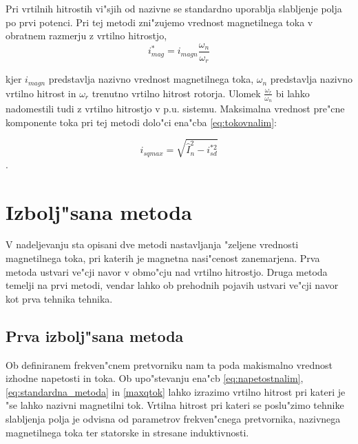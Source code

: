 \documentclass[journal,a4paper,twoside]{sty/IEEEtran}
\begin{document}
Pri vrtilnih hitrostih vi"sjih od nazivne se standardno uporablja slabljenje polja po prvi potenci. Pri tej metodi zni"zujemo vrednost magnetilnega toka v obratnem razmerju z vrtilno hitrostjo,
\begin{equation}
\label{eq:standardna_metoda}
i_{mag}^*=i_{magn}\frac{\omega_n}{\omega_r}
\end{equation}

kjer $i_{magn}$ predstavlja nazivno vrednost magnetilnega toka, $\omega_{n}$ predstavlja nazivno vrtilno hitrost in $\omega_{r}$ trenutno vrtilno hitrost rotorja. Ulomek $\frac{\omega_r}{\omega_n}$ bi lahko nadomestili tudi z vrtilno hitrostjo v p.u. sistemu. Maksimalna vrednost pre"cne komponente toka pri tej metodi dolo"ci ena"cba \ref{eq:tokovnalim}:

\begin{equation}
i_{sqmax}=\sqrt{\hat{I}_n^2-i_{sd}^{*2}}
\label{maxqtok}
\end{equation}.










\section{Izbolj"sana metoda}



V nadeljevanju sta opisani dve metodi nastavljanja "zeljene vrednosti magnetilnega toka, pri katerih je magnetna nasi"cenost zanemarjena. Prva metoda ustvari ve"cji navor v obmo"cju nad vrtilno hitrostjo. Druga metoda temelji na prvi metodi, vendar lahko ob prehodnih pojavih ustvari ve"cji navor kot prva tehnika tehnika.

\subsection{Prva izbolj"sana metoda}



Ob definiranem frekven"cnem pretvorniku nam ta poda makismalno vrednost izhodne napetosti in toka. Ob upo"stevanju ena"cb \ref{eq:napetostnalim}, \ref{eq:standardna_metoda} in \ref{maxqtok} lahko izrazimo vrtilno hitrost pri kateri je "se lahko nazivni magnetilni tok. Vrtilna hitrost pri kateri se poslu"zimo tehnike slabljenja polja je odvisna od parametrov frekven"cnega pretvornika, nazivnega magnetilnega toka ter statorske in stresane induktivnosti. 
\end{document}
